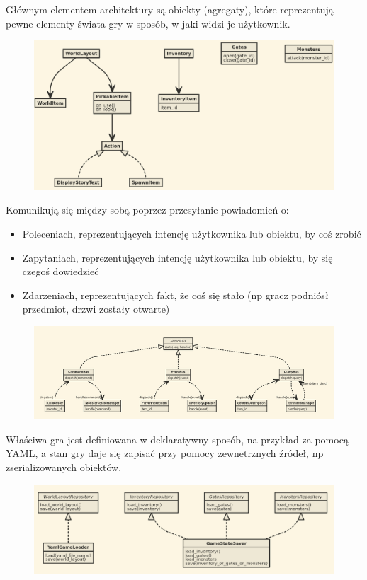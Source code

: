 \documentclass[12pt]{article}
\begin{document}
Głównym elementem architektury są obiekty (agregaty), które reprezentują pewne elementy
świata gry w sposób, w jaki widzi je użytkownik.

\begin{figure}[h]
  \centering
  \includegraphics[width=\textwidth]{aggregates}
\end{figure}

Komunikują się między sobą poprzez przesyłanie powiadomień o:

\begin{itemize}
\item Poleceniach, reprezentujących intencję użytkownika lub obiektu, by coś zrobić
\item Zapytaniach, reprezentujących intencję użytkownika lub obiektu, by
  się czegoś dowiedzieć
\item Zdarzeniach, reprezentujących fakt, że coś się stało (np gracz podniósł
  przedmiot, drzwi zostały otwarte)
\end{itemize}

\begin{figure}[h]
  \centering
  \includegraphics[width=\textwidth]{messaging}
\end{figure}

Właściwa gra jest definiowana w deklaratywny sposób, na przykład za pomocą YAML,
a stan gry daje się zapisać przy pomocy zewnetrznych źródeł, np zserializowanych obiektów.

\begin{figure}[h]
  \centering
  \includegraphics[width=\textwidth]{repositories}
\end{figure}
\end{document}
